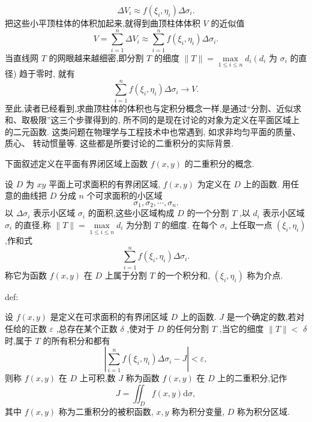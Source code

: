 \[
\Delta {V}_{i} \approx  f\left( {{\xi }_{i},{\eta }_{i}}\right) \Delta {\sigma }_{i}.
\]
把这些小平顶柱体的体积加起来,就得到曲顶柱体体积 \(V\) 的近似值
\[
V = \mathop{\sum }\limits_{{i = 1}}^{n}\Delta {V}_{i} \approx  \mathop{\sum }\limits_{{i = 1}}^{n}f\left( {{\xi }_{i},{\eta }_{i}}\right) \Delta {\sigma }_{i}.
\]
当直线网 \(T\) 的网眼越来越细密,即分割 \(T\) 的细度 \(\parallel T\parallel  = \mathop{\max }\limits_{{1 \leq  i \leq  n}}{d}_{i}\left( {d}_{i}\right.\) 为 \({\sigma }_{i}\) 的直径) 趋于零时, 就有
\[
\mathop{\sum }\limits_{{i = 1}}^{n}f\left( {{\xi }_{i},{\eta }_{i}}\right) \Delta {\sigma }_{i} \rightarrow  V.
\]
至此,读者已经看到,求曲顶柱体的体积也与定积分概念一样,是通过“分割、近似求和、取极限”这三个步骤得到的, 所不同的是现在讨论的对象为定义在平面区域上的二元函数. 这类问题在物理学与工程技术中也常遇到, 如求非均匀平面的质量、质心、 转动惯量等. 这些都是所要讨论的二重积分的实际背景.

下面叙述定义在平面有界闭区域上函数 \(f\left( {x,y}\right)\) 的二重积分的概念.

设 \(D\) 为 \({xy}\) 平面上可求面积的有界闭区域, \(f\left( {x,y}\right)\) 为定义在 \(D\) 上的函数. 用任意的曲线把 \(D\) 分成 \(n\) 个可求面积的小区域
\[
{\sigma }_{1},{\sigma }_{2},\cdots ,{\sigma }_{n}.
\]
以 \(\Delta {\sigma }_{i}\) 表示小区域 \({\sigma }_{i}\) 的面积,这些小区域构成 \(D\) 的一个分割 \(T\) ,以 \({d}_{i}\) 表示小区域 \({\sigma }_{i}\) 的直径,称 \(\parallel T\parallel  = \mathop{\max }\limits_{{1 \leq  i \leq  n}}{d}_{i}\) 为分割 \(T\) 的细度. 在每个 \({\sigma }_{i}\) 上任取一点 \(\left( {{\xi }_{i},{\eta }_{i}}\right)\) ,作和式
\[
\mathop{\sum }\limits_{{i = 1}}^{n}f\left( {{\xi }_{i},{\eta }_{i}}\right) \Delta {\sigma }_{i}.
\]
称它为函数 \(f\left( {x,y}\right)\) 在 \(D\) 上属于分割 \(T\) 的一个积分和, \(\left( {{\xi }_{i},{\eta }_{i}}\right)\) 称为介点.

\begin{definition}{}{def:}

\end{definition}
设 \(f\left( {x,y}\right)\) 是定义在可求面积的有界闭区域 \(D\) 上的函数. \(J\) 是一个确定的数,若对任给的正数 \(\varepsilon\) ,总存在某个正数 \(\delta\) ,使对于 \(D\) 的任何分割 \(T\) ,当它的细度 \(\parallel T\parallel  <\)  \(\delta\) 时,属于 \(T\) 的所有积分和都有
\[
\left| {\mathop{\sum }\limits_{{i = 1}}^{n}f\left( {{\xi }_{i},{\eta }_{i}}\right) \Delta {\sigma }_{i} - J}\right|  < \varepsilon , \tag{4}
\]
则称 \(f\left( {x,y}\right)\) 在 \(D\) 上可积,数 \(J\) 称为函数 \(f\left( {x,y}\right)\) 在 \(D\) 上的二重积分,记作
\[
J = {\iint }_{D}f\left( {x,y}\right) \mathrm{d}\sigma , \tag{5}
\]
其中 \(f\left( {x,y}\right)\) 称为二重积分的被积函数, \(x,y\) 称为积分变量, \(D\) 称为积分区域.

